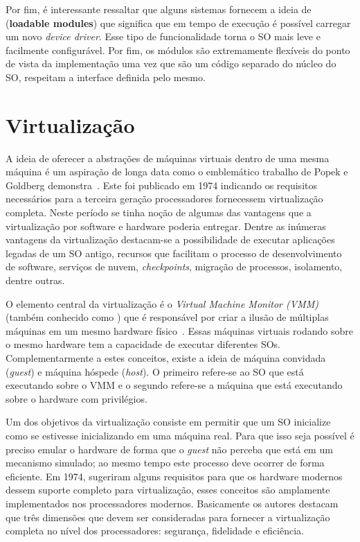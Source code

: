 Por fim, é interessante ressaltar que alguns sistemas fornecem a ideia de
 (\textbf{loadable modules}) que significa que em
tempo de execução é possível carregar um novo \emph{device driver}. Esse tipo
de funcionalidade torna o SO mais leve e facilmente configurável. Por fim, os
módulos são extremamente flexíveis do ponto de vista da implementação uma vez
que são um código separado do núcleo do SO, respeitam a interface definida pelo
mesmo.

\section{Virtualização}
\label{sec:virtualizacao}


A ideia de oferecer a abstrações de máquinas virtuais dentro de uma mesma
máquina é um aspiração de longa data como o emblemático trabalho de Popek e
Goldberg demonstra~\citep{popek}. Este foi publicado em 1974 indicando os
requisitos necessários para a terceira geração processadores fornecessem
virtualização completa. Neste período se tinha noção de algumas das vantagens
que a virtualização por software e hardware poderia entregar. Dentre as
inúmeras vantagens da virtualização destacam-se a possibilidade de executar
aplicações legadas de um SO antigo, recursos que facilitam o processo de
desenvolvimento de software, serviços de nuvem, \emph{checkpoints}, migração de
processos, isolamento, dentre outras.

O elemento central da virtualização é o \emph{Virtual Machine Monitor (VMM)}
(também conhecido como ) que é responsável por criar a
ilusão de múltiplas máquinas em um mesmo hardware físico~\citep{tanenbaum}.
Essas máquinas virtuais rodando sobre o mesmo hardware tem a capacidade de
executar diferentes SOs. Complementarmente a estes conceitos, existe a ideia de
máquina convidada (\emph{guest}) e máquina hóspede (\emph{host}). O primeiro
refere-se ao SO que está executando sobre o VMM e o segundo refere-se a máquina
que está executando sobre o hardware com privilégios.

Um dos objetivos da virtualização consiste em permitir que um SO inicialize
como se estivesse inicializando em uma máquina real. Para que isso seja
possível é preciso emular o hardware de forma que o \emph{guest} não perceba
que está em um mecanismo simulado; ao mesmo tempo este processo deve ocorrer de
forma eficiente. Em 1974, \cite{popek} sugeriram alguns requisitos para que os
hardware modernos dessem suporte completo para virtualização, esses conceitos
são amplamente implementados nos processadores modernos. Basicamente os autores
destacam que três dimensões que devem ser consideradas para fornecer a
virtualização completa no nível dos processadores: segurança, fidelidade e
eficiência.

